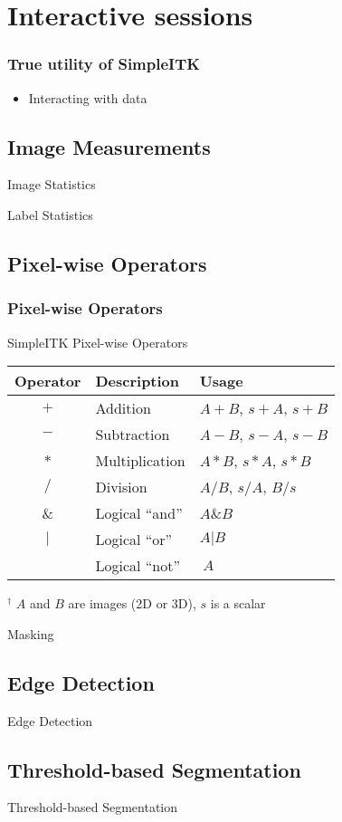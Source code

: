 \section{Interactive sessions}

\begin{frame}
\frametitle{True utility of SimpleITK}
\begin{itemize}
\item Interacting with data
\end{itemize}
\end{frame}

\subsection{Image Measurements}
\begin{frame}{Image Statistics}
\end{frame}

\begin{frame}{Label Statistics}
\end{frame}

\subsection{Pixel-wise Operators}
\begin{frame}[fragile]
\frametitle{Pixel-wise Operators}
\begin{threeparttable}
  \caption{SimpleITK Pixel-wise Operators}
  \begin{tabular}{c||l|l}
    Operator & Description & Usage\tnote{$^\dagger$} \\
    \hline
    $+$        & Addition & $A + B$, $s+A$, $s+B$ \\
    $-$        & Subtraction & $A - B$, $s-A$, $s-B$ \\
    $*$        & Multiplication & $A * B$, $s*A$, $s*B$ \\
    $/$        & Division & $A / B$, $s/A$, $B/s$ \\
    $\&$        & Logical ``and'' & $A \& B$ \\
    $|$        & Logical ``or'' & $A | B$ \\
    $~$        & Logical ``not'' & $~A$
  \end{tabular}
  \begin{tablenotes}
    \item[$^\dagger$] $A$ and $B$ are images (2D or 3D), $s$ is a scalar
  \end{tablenotes}
\end{threeparttable}
\end{frame}

\begin{frame}{Masking}
\end{frame}


\subsection{Edge Detection}
\begin{frame}{Edge Detection}
\end{frame}

\subsection{Threshold-based Segmentation}
\begin{frame}{Threshold-based Segmentation}
\end{frame}





